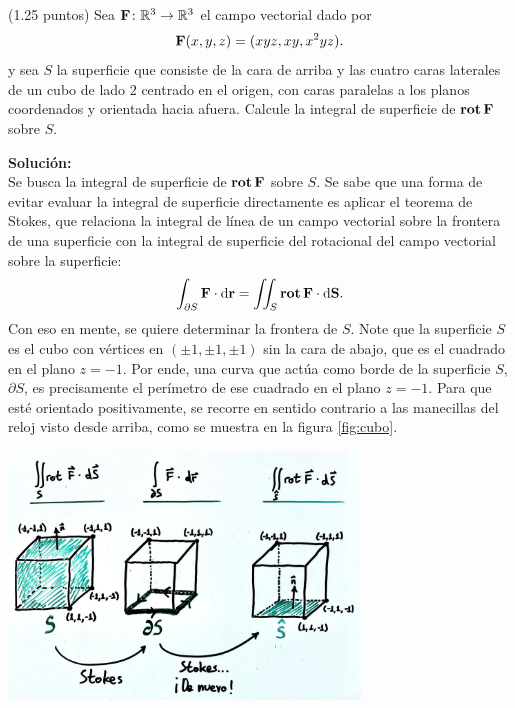 \documentclass{fmbvecto}
\begin{document}
\begin{problema}
    
    (1.25 puntos) Sea \(\boldsymbol{{\mathbf{F}}}\colon \mathbb{R}^3 \to \mathbb{R}^3\) el campo vectorial dado por
    \[
    \boldsymbol{{\mathbf{F}}}(x, y, z) = (xyz, xy, x^2yz).
    \]
    y sea \(S\) la superficie que consiste de la cara de arriba y las cuatro caras laterales de un cubo de lado \(2\) centrado en el origen, con caras paralelas a los planos coordenados y orientada hacia afuera. Calcule la integral de superficie de \(\operatorname{\mathbf{rot}} \boldsymbol{{\mathbf{F}}}\) sobre \(S\).

\tcblower
\textbf{Solución:}\\

    Se busca la integral de superficie de \(\operatorname{\mathbf{rot}} \boldsymbol{{\mathbf{F}}}\) sobre \(S\). Se sabe que una forma de evitar evaluar la integral de superficie directamente es aplicar el teorema de Stokes, que relaciona la integral de línea de un campo vectorial sobre la frontera de una superficie con la integral de superficie del rotacional del campo vectorial sobre la superficie:
    \[
    \int_{\partial S} \boldsymbol{{\mathbf{F}}} \cdot \mathrm{d}\boldsymbol{{\mathbf{r}}} = \iint_S \operatorname{\mathbf{rot}} \boldsymbol{{\mathbf{F}}} \cdot \mathrm{d}\boldsymbol{{\mathbf{S}}}.
    \]
    Con eso en mente, se quiere determinar la frontera de  \(S\). Note que la superficie \(S\) es el cubo con vértices en \((\pm 1, \pm 1, \pm 1)\) sin la cara de abajo, que es el cuadrado en el plano \(z = -1\). Por ende, una curva que actúa como borde de la superficie \(S\), \(\partial S\), es precisamente el perímetro de ese cuadrado en el plano \(z = -1\). Para que esté orientado positivamente, se recorre en sentido contrario a las manecillas del reloj visto desde arriba, como se muestra en la figura \ref{fig:cubo}.

    \begin{center}
    \includegraphics[width=0.7\textwidth]{stokes.jpeg}
    \label{fig:cubo}
    \end{center}
    \vspace*{1em}


\end{problema}
\end{document}
